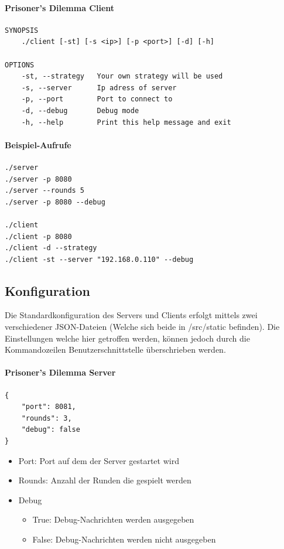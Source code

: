 \documentclass[12pt, letterpaper]{article}
\begin{document}
\paragraph{Prisoner's Dilemma Client}
\begin{Verbatim}
SYNOPSIS
    ./client [-st] [-s <ip>] [-p <port>] [-d] [-h]

OPTIONS
    -st, --strategy   Your own strategy will be used
    -s, --server      Ip adress of server
    -p, --port        Port to connect to
    -d, --debug       Debug mode
    -h, --help        Print this help message and exit
\end{Verbatim}

\paragraph{Beispiel-Aufrufe}
\begin{Verbatim}
./server
./server -p 8080
./server --rounds 5
./server -p 8080 --debug

./client
./client -p 8080
./client -d --strategy
./client -st --server "192.168.0.110" --debug
\end{Verbatim}

\subsection{Konfiguration}
Die Standardkonfiguration des Servers und Clients erfolgt mittels zwei verschiedener JSON-Dateien (Welche sich beide in /src/static befinden). Die Einstellungen welche hier getroffen werden, können jedoch durch die Kommandozeilen Benutzerschnittstelle überschrieben werden. 

\paragraph{Prisoner's Dilemma Server}

\begin{verbatim}
{
    "port": 8081,
    "rounds": 3,
    "debug": false
}
\end{verbatim}

\begin{itemize}
	\item Port: Port auf dem der Server gestartet wird
	\item Rounds: Anzahl der Runden die gespielt werden
	\item Debug
	\begin{itemize}
		\item True: Debug-Nachrichten werden ausgegeben
		\item False: Debug-Nachrichten werden nicht ausgegeben
	\end{itemize}
\end{itemize}
\end{document}
